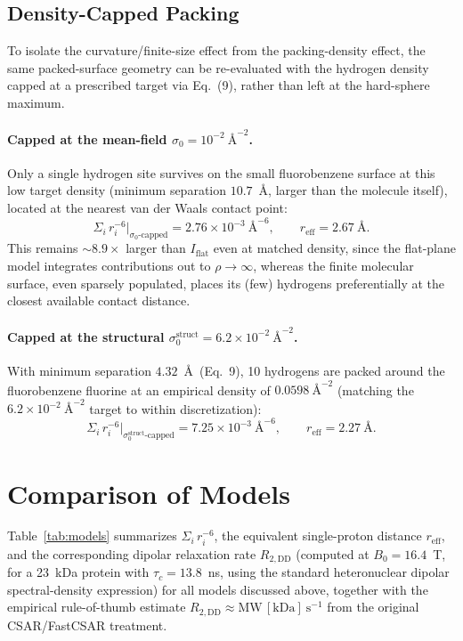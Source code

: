 \documentclass[11pt]{article}
\begin{document}
\subsection{Density-Capped Packing}
To isolate the curvature/finite-size effect from the packing-density effect, the same packed-surface geometry can be re-evaluated with the hydrogen density capped at a prescribed target via Eq.~(9), rather than left at the hard-sphere maximum.

\paragraph{Capped at the mean-field $\sigma_0 = 10^{-2}~\text{\AA}^{-2}$.} Only a single hydrogen site survives on the small fluorobenzene surface at this low target density (minimum separation $10.7$~\AA, larger than the molecule itself), located at the nearest van der Waals contact point:
\begin{equation}
\Sigma_i\, r_i^{-6}\big|_{\sigma_0\mathrm{\text{-}capped}} = 2.76\times 10^{-3}~\text{\AA}^{-6}, \qquad r_{\mathrm{eff}} = 2.67~\text{\AA}.
\end{equation}
This remains $\sim\!8.9\times$ larger than $I_{\mathrm{flat}}$ even at matched density, since the flat-plane model integrates contributions out to $\rho\to\infty$, whereas the finite molecular surface, even sparsely populated, places its (few) hydrogens preferentially at the closest available contact distance.

\paragraph{Capped at the structural $\sigma_0^{\mathrm{struct}} = 6.2\times10^{-2}~\text{\AA}^{-2}$.} With minimum separation $4.32$~\AA\ (Eq.~9), 10 hydrogens are packed around the fluorobenzene fluorine at an empirical density of $0.0598~\text{\AA}^{-2}$ (matching the $6.2\times10^{-2}~\text{\AA}^{-2}$ target to within discretization):
\begin{equation}
\Sigma_i\, r_i^{-6}\big|_{\sigma_0^{\mathrm{struct}}\mathrm{\text{-}capped}} = 7.25\times 10^{-3}~\text{\AA}^{-6}, \qquad r_{\mathrm{eff}} = 2.27~\text{\AA}.
\end{equation}

\section{Comparison of Models}
Table~\ref{tab:models} summarizes $\Sigma_i\, r_i^{-6}$, the equivalent single-proton distance $r_{\mathrm{eff}}$, and the corresponding dipolar relaxation rate $R_{2,\mathrm{DD}}$ (computed at $B_0 = 16.4$~T, for a 23~kDa protein with $\tau_c = 13.8$~ns, using the standard heteronuclear dipolar spectral-density expression) for all models discussed above, together with the empirical rule-of-thumb estimate $R_{2,\mathrm{DD}} \approx \mathrm{MW\,[kDa]}~\mathrm{s}^{-1}$ from the original CSAR/FastCSAR treatment.
\end{document}
